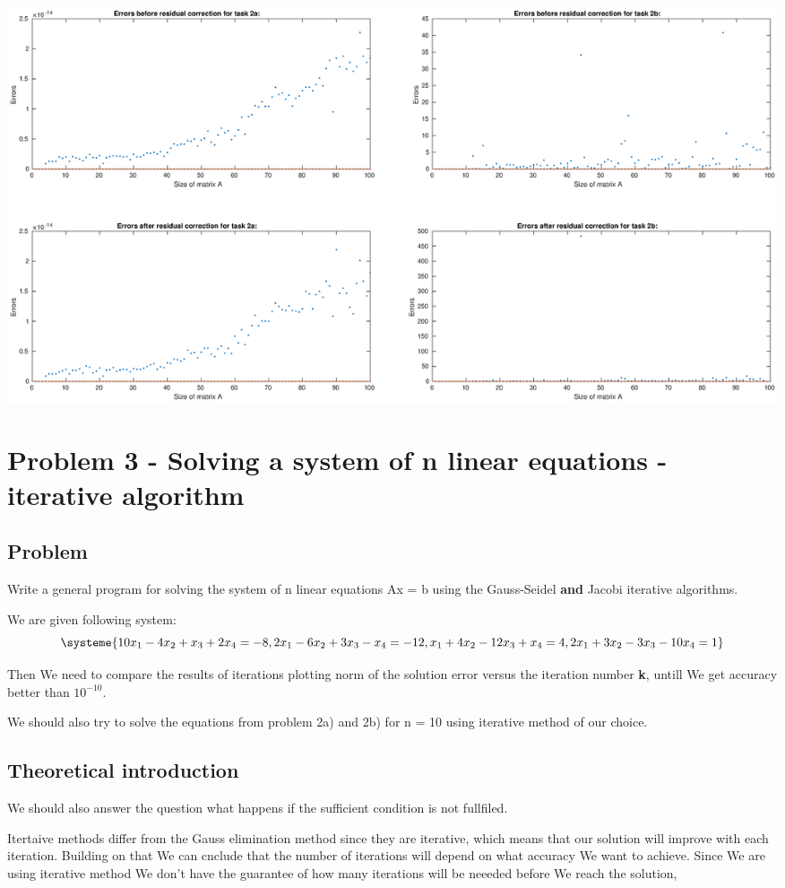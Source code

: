 \documentclass[12pt]{report}
\begin{document}
\begin{center}
   \includegraphics[scale=0.75]{errorsNoResidual.eps}
\end{center}





\chapter{Problem 3 - Solving a system of n linear equations - iterative algorithm}

\section{Problem}
Write a general program for solving the system of n linear equations Ax = b using the Gauss-Seidel \textbf{and} Jacobi iterative algorithms.

We are given following system:
\[
\systeme{10x_1-4x_2+x_3+2x_4=-8, 2x_1-6x_2+3x_3-x_4=-12, x_1+4x_2-12x_3+x_4=4, 2x_1+3x_2-3x_3-10x_4=1}
\]

Then We need to compare the results of iterations plotting norm of the solution error versus the iteration number \textbf{k}, untill We get accuracy better than $10^{-10}$.

We should also try to solve the equations from problem 2a) and 2b) for n = 10 using iterative method of our choice.


\section{Theoretical introduction}

 We should also answer the question what happens if the sufficient condition is not fullfiled.

Itertaive methods differ from the Gauss elimination method since they are iterative, which means that our solution will improve with each iteration. Building on that We can cnclude that the number of iterations will depend on what accuracy We want to achieve. Since We are using iterative method We don't have the guarantee of how many iterations will be neeeded before We reach the solution,
\end{document}
